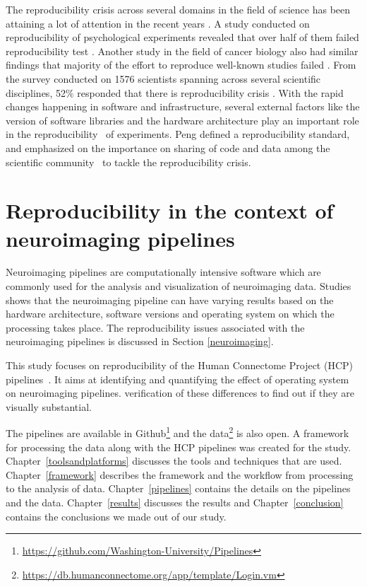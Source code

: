 The reproducibility crisis across several domains in the field of 
science has been attaining a lot of attention in the recent years 
\cite{aac4716,Begley2012,Button2013,Baker2016,Estimating-reproducibility,Gla15}. 
A study conducted on reproducibility of psychological experiments 
revealed that over half of them failed reproducibility test 
\cite{aac4716}. Another study in the field of cancer biology also had 
similar findings that majority of the effort to reproduce well-known 
studies failed \cite{Begley2012}. From the survey conducted on 1576 
scientists spanning across several scientific disciplines, 52\% 
responded that there is reproducibility crisis . With the rapid changes 
happening in software and infrastructure, several external factors like 
the version of software libraries and the hardware architecture play
an important role in the 
reproducibility~\cite{10.1371/journal.pone.0038234,Gla15} of 
experiments. Peng defined a reproducibility standard, and emphasized on 
the importance on sharing of code and data among the scientific 
community~\cite{Peng2011} to tackle the reproducibility  crisis.

\section{Reproducibility in the context of neuroimaging pipelines}
Neuroimaging pipelines are computationally intensive software which are 
commonly used for the analysis and visualization of neuroimaging data. 
Studies~\cite{10.1371/journal.pone.0038234,Gla15} shows that the 
neuroimaging pipeline can have varying results based on the hardware 
architecture, software versions and operating system on which the 
processing takes place. The reproducibility issues associated with the 
neuroimaging pipelines is discussed in Section \ref{neuroimaging}.

This study focuses on reproducibility of the Human Connectome Project 
(HCP) pipelines~\cite{Gla13}. It aims at
identifying and quantifying the effect of operating system on neuroimaging pipelines.%
verification of these differences to find out if they are visually 
substantial.

The pipelines are available in 
Github\footnote{\url{https://github.com/Washington-University/Pipelines}} 
and the 
data\footnote{\url{https://db.humanconnectome.org/app/template/Login.vm}} 
is also open. A framework for processing the data along with the HCP 
pipelines was created for the study. Chapter~\ref{toolsandplatforms} 
discusses the tools and techniques that are used. 
Chapter~\ref{framework} describes the framework and the workflow from 
processing to the analysis of data. Chapter~\ref{pipelines} contains 
the details on the pipelines and the data. Chapter~\ref{results} 
discusses the results and Chapter~\ref{conclusion} contains the 
conclusions we made out of our study.

